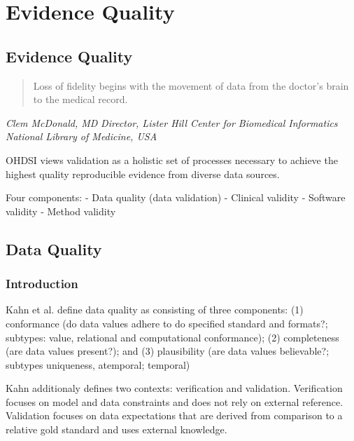 \documentclass[11pt]{book}
\begin{document}
\part{Evidence Quality}\label{part-evidence-quality}

\chapter{Evidence Quality}\label{EvidenceQuality}

\begin{quote}
Loss of fidelity begins with the movement of data from the doctor's
brain to the medical record.
\end{quote}

\emph{Clem McDonald, MD} \emph{Director, Lister Hill Center for
Biomedical Informatics} \emph{National Library of Medicine, USA}

OHDSI views validation as a holistic set of processes necessary to
achieve the highest quality reproducible evidence from diverse data
sources.

Four components: - Data quality (data validation) - Clinical validity -
Software validity - Method validity

\chapter{Data Quality}\label{DataQuality}

\section{Introduction}\label{introduction}

Kahn et al. define data quality as consisting of three components: (1)
conformance (do data values adhere to do specified standard and
formats?; subtypes: value, relational and computational conformance);
(2) completeness (are data values present?); and (3) plausibility (are
data values believable?; subtypes uniqueness, atemporal; temporal)
\citep{kahn_harmonized_2016}

Kahn additionaly defines two contexts: verification and validation.
Verification focuses on model and data constraints and does not rely on
external reference. Validation focuses on data expectations that are
derived from comparison to a relative gold standard and uses external
knowledge.
\end{document}
